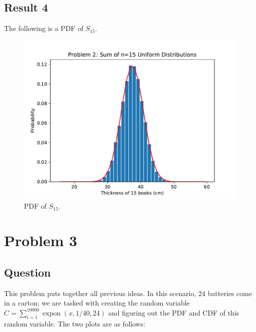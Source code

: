 \documentclass{article}
\DeclareMathOperator{\expon}{expon}
\begin{document}
\subsection{Result 4} The following is a PDF of \(S_{15}\).

\begin{figure}[H]
    \centering
    \includegraphics[width=\textwidth]{Images/Figure7}
    \caption{PDF of \(S_{15}\).}
    \label{P2:S15}
\end{figure}

\section{Problem 3}
\subsection{Question} This problem puts together all previous
ideas. In this scenario, 24 batteries come in a carton;
we are tasked with creating the random variable
\(C = \sum_{i=1}^{\num{10000}} \expon(x, 1/40, 24)\) and
figuring out the PDF and CDF of this random variable. The
two plots are as follows:
\end{document}
